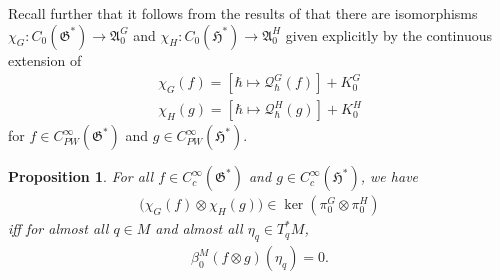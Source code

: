 \documentclass[sn-mathphys,Numbered]{sn-jnl}
\newtheorem{proposition}[theorem]{Proposition}%
\begin{document}
Recall further that it follows from the results of \citet{StFe21} that there are isomorphisms $\chi_G: C_0(\mathfrak{G}^*)\to \mathfrak{A}_0^G$ and $\chi_H: C_0(\mathfrak{H}^*)\to\mathfrak{A}_0^H$ given explicitly by the continuous extension of
\begin{align}
    \chi_G(f) = [\hbar\mapsto \mathcal{Q}_\hbar^G(f)] + K_0^G\\
    \chi_H(g) = [\hbar\mapsto \mathcal{Q}_\hbar^H(g)] + K_0^H
\end{align}
for $f\in C^\infty_{PW}(\mathfrak{G}^*)$ and $g\in C^{\infty}_{PW}(\mathfrak{H}^*)$.\bigskip

\begin{proposition}
\label{prop:kernel}
For all $f\in C_c^\infty(\mathfrak{G}^*)$ and $g\in C_c^\infty(\mathfrak{H}^*)$, we have 
\begin{align}
    \big(\chi_G(f)\otimes \chi_H(g)\big)\in \ker(\pi_0^G\otimes\pi_0^H)
    \end{align}
iff for almost all $q\in M$ and almost all $\eta_q\in T^*_qM$,
\begin{align}
    \beta_0^M(f\otimes g)(\eta_q) = 0.
\end{align}
\end{proposition}
\end{document}
